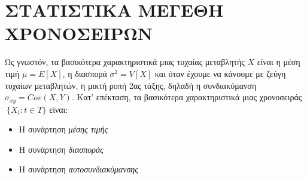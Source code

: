 \section{ΣΤΑΤΙΣΤΙΚΑ ΜΕΓΕΘΗ ΧΡΟΝΟΣΕΙΡΩΝ }
Ως γνωστόν, τα βασικότερα χαρακτηριστικά μιας τυχαίας μεταβλητής $ X $ είναι η
μέση τιμή $\mu = E \left[  X \right]  $, η διασπορά $ \sigma^2 = V \left[  X \right] $ και όταν έχουμε να κάνουμε με ζεύγη
τυχαίων μεταβλητών, η μικτή ροπή 2ας τάξης, δηλαδή η συνδιακύμανση
$\sigma_{xy} = Cov \left(  X , Y \right)  $. Κατ' επέκταση, τα βασικότερα χαρακτηριστικά μιας χρονοσειράς
$\: \{ X_t : t \in T \}$ είναι:\\
\begin{itemize}
\item H συνάρτηση \textit{μέσης τιμής}
\item Η συνάρτηση \textit{διασποράς}
\item Η συνάρτηση \textit{αυτοσυνδιακύμανσης}

\end{itemize}
